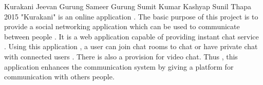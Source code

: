  \begin{conf-abstract}[]
 {Kurakani }
{
Jeevan Gurung 
Sameer Gurung
Sumit Kumar Kashyap
Sunil Thapa
}
{ 2015 }
"Kurakani" is an online application . The basic purpose of this project is to provide a social networking application which can be used to communicate between people . It is a web application capable of providing instant chat service . Using this application , a user can join chat rooms to chat or have private chat with connected users . There is also a provision for video chat. Thus , this application enhances the communication system by giving a platform for communication with others people.
  \end{conf-abstract}